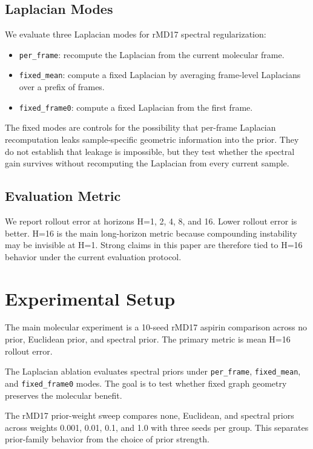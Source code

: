 \documentclass[pdflatex,sn-mathphys-num]{sn-jnl}
\begin{document}
\subsection{Laplacian Modes}

We evaluate three Laplacian modes for rMD17 spectral regularization:
\begin{itemize}
    \item \texttt{per\_frame}: recompute the Laplacian from the current molecular frame.
    \item \texttt{fixed\_mean}: compute a fixed Laplacian by averaging frame-level Laplacians over a prefix of frames.
    \item \texttt{fixed\_frame0}: compute a fixed Laplacian from the first frame.
\end{itemize}
The fixed modes are controls for the possibility that per-frame Laplacian recomputation leaks sample-specific geometric information into the prior. They do not establish that leakage is impossible, but they test whether the spectral gain survives without recomputing the Laplacian from every current sample.

\subsection{Evaluation Metric}

We report rollout error at horizons H=1, 2, 4, 8, and 16. Lower rollout error is better. H=16 is the main long-horizon metric because compounding instability may be invisible at H=1. Strong claims in this paper are therefore tied to H=16 behavior under the current evaluation protocol.

\section{Experimental Setup}

The main molecular experiment is a 10-seed rMD17 aspirin comparison across no prior, Euclidean prior, and spectral prior. The primary metric is mean H=16 rollout error.

The Laplacian ablation evaluates spectral priors under \texttt{per\_frame}, \texttt{fixed\_mean}, and \texttt{fixed\_frame0} modes. The goal is to test whether fixed graph geometry preserves the molecular benefit.

The rMD17 prior-weight sweep compares none, Euclidean, and spectral priors across weights 0.001, 0.01, 0.1, and 1.0 with three seeds per group. This separates prior-family behavior from the choice of prior strength.
\end{document}
